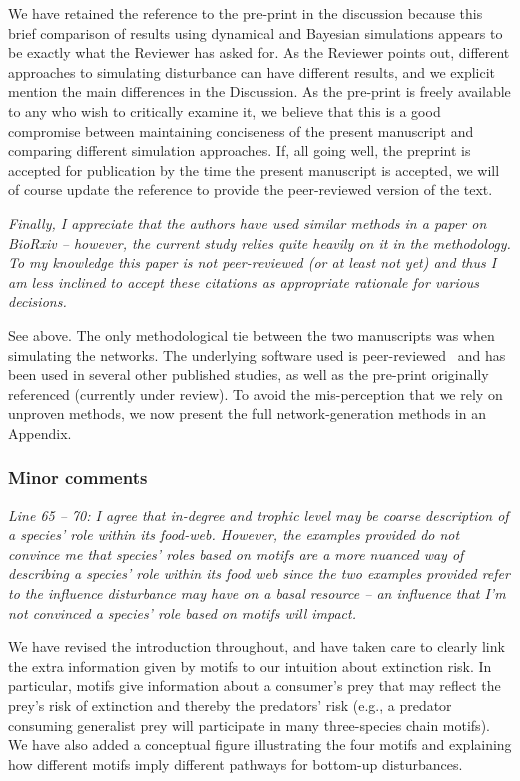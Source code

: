 \documentclass[12pt]{article}
\newcommand{\us}{\rm \setlength{\leftskip}{0.3cm} \setlength{\rightskip}{0.3cm}}
\newcommand{\them}{\it \setlength{\leftskip}{0cm} \setlength{\rightskip}{0cm}}
\begin{document}
        
        We have retained the reference to the pre-print in the discussion because this brief comparison of results using dynamical and Bayesian simulations appears to be exactly what the Reviewer has asked for.
        As the Reviewer points out, different approaches to simulating disturbance can have different results, and we explicit mention the main differences in the Discussion. 
        As the pre-print is freely available to any who wish to critically examine it, we believe that this is a good compromise between maintaining conciseness of the present manuscript and comparing different simulation approaches.
        If, all going well, the preprint is accepted for publication by the time the present manuscript is accepted, we will of course update the reference to provide the peer-reviewed version of the text.
        
        
        \them
        Finally, I appreciate that the authors have used similar methods in a paper on BioRxiv – however, the current study relies quite heavily on it in the methodology. To my knowledge this paper is not peer-reviewed (or at least not yet) and thus I am less inclined to accept these citations as appropriate rationale for various decisions.
        
        \us See above. The only methodological tie between the two manuscripts was when simulating the networks. The underlying software used is peer-reviewed~\citep{Delmas2017} and has been used in several other published studies, as well as the pre-print originally referenced (currently under review). To avoid the mis-perception that we rely on unproven methods, we now present the full network-generation methods in an Appendix.

    \subsubsection*{Minor comments}
        
        \them
        Line 65 – 70: I agree that in-degree and trophic level may be coarse description of a species' role within its food-web. However, the examples provided do not convince me that species' roles based on motifs are a more nuanced way of describing a species' role within its food web since the two examples provided refer to the influence disturbance may have on a basal resource – an influence that I'm not convinced a species' role based on motifs will impact.  
        
        
        \us
        We have revised the introduction throughout, and have taken care to clearly link the extra information given by motifs to our intuition about extinction risk. In particular, motifs give information about a consumer's prey that may reflect the prey's risk of extinction and thereby the predators' risk (e.g., a predator consuming generalist prey will participate in many three-species chain motifs). We have also added a conceptual figure illustrating the four motifs and explaining how different motifs imply different pathways for bottom-up disturbances.
        
\end{document}
